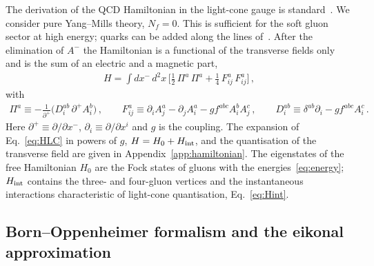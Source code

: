 The derivation of the QCD Hamiltonian in the light-cone gauge is standard~\cite{Brodsky:1997de,Lublinsky:2016meo}. We consider pure Yang--Mills theory, $N_f=0$. This is sufficient for the soft gluon sector at high energy; quarks can be added along the lines of~\cite{Lublinsky:2016meo}. After the elimination of $A^-$ the Hamiltonian is a functional of the transverse fields only and is the sum of an electric and a magnetic part,
\begin{align}\label{eq:HLC}
H=\int dx^-\,d^2x\,\Big[\frac12\,\Pi^a\,\Pi^a+\frac14\,F^a_{ij}\,F^a_{ij}\Big]\,,
\end{align}
with
\begin{align}\label{eq:PiF}
\Pi^a\equiv-\frac{1}{\partial^+}\big(D^{ab}_i\,\partial^+A^b_i\big)\,,\qquad
F^a_{ij}\equiv\partial_iA^a_j-\partial_jA^a_i-gf^{abc}A^b_iA^c_j\,,\qquad
D^{ab}_i\equiv\delta^{ab}\partial_i-gf^{abc}A^c_i\,.
\end{align}
Here $\partial^+\equiv\partial/\partial x^-$, $\partial_i\equiv\partial/\partial x^i$ and $g$ is the coupling. The expansion of Eq.~\eqref{eq:HLC} in powers of $g$, $H=H_0+H_{\rm int}$, and the quantisation of the transverse field are given in Appendix~\ref{app:hamiltonian}. The eigenstates of the free Hamiltonian $H_0$ are the Fock states of gluons with the energies~\eqref{eq:energy}; $H_{\rm int}$ contains the three- and four-gluon vertices and the instantaneous interactions characteristic of light-cone quantisation, Eq.~\eqref{eq:Hint}.

\subsection{Born--Oppenheimer formalism and the eikonal approximation}\label{sec:BO}

